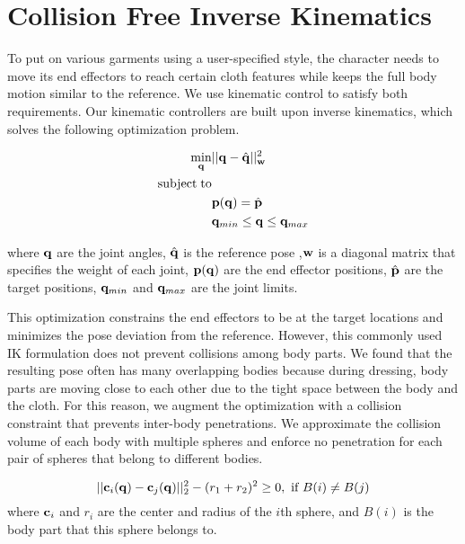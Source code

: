 \section{Collision Free Inverse Kinematics}

To put on various garments using a user-specified style, the character needs to move its end effectors to reach certain cloth features while keeps the full body motion similar to the reference. We use kinematic control to satisfy both requirements. Our kinematic controllers are built upon inverse kinematics, which solves the following optimization problem.

\begin{align}
\label{eq:IK}
  \min_{\mathbf{q}} & ||\mathbf{q} - \hat{\mathbf{q}}||_{\mathbf{w}}^2 \\
  \nonumber  \mathrm{subject\;} \mathrm{to} & \\
  \nonumber  &\mathbf{p}(\mathbf{q}) = \hat{\mathbf{p}}\\
\nonumber   &\mathbf{q}_{min} \leq \mathbf{q} \leq \mathbf{q}_{max}
\end{align}

where $\mathbf{q}$ are the joint angles, $\hat{\mathbf{q}}$ is the reference pose ,$\mathbf{w}$ is a diagonal matrix that specifies the weight of each joint, $\mathbf{p}(\mathbf{q})$ are the end effector positions, $\hat{\mathbf{p}}$ are the target positions, $\mathbf{q}_{min}$ and $\mathbf{q}_{max}$ are the joint limits.

This optimization constrains the end effectors to be at the target locations and minimizes the pose deviation from the reference. However, this commonly used IK formulation does not prevent collisions among body parts. We found that the resulting pose often has many overlapping bodies because during dressing, body parts are moving close to each other due to the tight space between the body and the cloth. For this reason, we augment the optimization with a collision constraint that prevents inter-body penetrations. We approximate the collision volume of each body with multiple spheres and enforce no penetration for each pair of spheres that belong to different bodies.

\begin{equation}
  ||\mathbf{c}_i(\mathbf{q}) - \mathbf{c}_j(\mathbf{q})||_2^2 - (r_1 + r_2)^2 \geq 0,\mbox{ if }B(i) \neq B(j)
  \label{eq:collision}
\end{equation}
where $\mathbf{c}_i$ and $r_i$ are the center and radius of the $i$th sphere, and $B(i)$ is the body part that this sphere belongs to.

